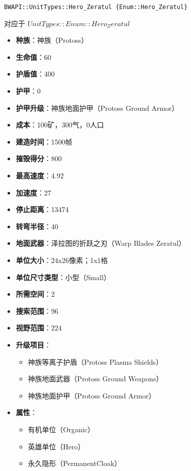 \begin{tcolorbox}[colback=white, colframe=black!60!white, title=Hero\_Zeratul(), arc=0mm]
    \begin{verbatim}
BWAPI::UnitTypes::Hero_Zeratul {Enum::Hero_Zeratul}
    \end{verbatim}
    对应于  $ UnitTypes::Enum::Hero_Zeratul $ 
    \begin{itemize}
        \item \textbf{种族}：神族（Protoss）
        \item \textbf{生命值}：60
        \item \textbf{护盾值}：400
        \item \textbf{护甲}：0
        \item \textbf{护甲升级}：神族地面护甲（Protoss Ground Armor）
        \item \textbf{成本}：100矿，300气，0人口
        \item \textbf{建造时间}：1500帧
        \item \textbf{摧毁得分}：800
        \item \textbf{最高速度}：4.92
        \item \textbf{加速度}：27
        \item \textbf{停止距离}：13474
        \item \textbf{转弯半径}：40
        \item \textbf{地面武器}：泽拉图的折跃之刃（Warp Blades Zeratul）
        \item \textbf{单位大小}：24x26像素；1x1格
        \item \textbf{单位尺寸类型}：小型（Small）
        \item \textbf{所需空间}：2
        \item \textbf{搜索范围}：96
        \item \textbf{视野范围}：224
        \item \textbf{升级项目}：
            \begin{itemize}
                \item 神族等离子护盾（Protoss Plasma Shields）
                \item 神族地面武器（Protoss Ground Weapons）
                \item 神族地面护甲（Protoss Ground Armor）
            \end{itemize}
        \item \textbf{属性}：
            \begin{itemize}
                \item 有机单位（Organic）
                \item 英雄单位（Hero）
                \item 永久隐形（PermanentCloak）
            \end{itemize}
    \end{itemize}
\end{tcolorbox}


